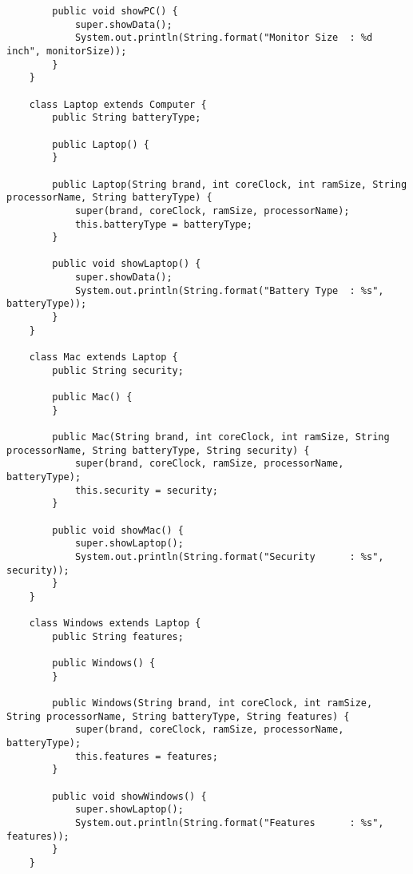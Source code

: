 \documentclass[12pt,titlepage]{article}
\begin{document}
\begin{verbatim}
        public void showPC() {
            super.showData();
            System.out.println(String.format("Monitor Size  : %d inch", monitorSize));
        }
    }

    class Laptop extends Computer {
        public String batteryType;
        
        public Laptop() {
        }
        
        public Laptop(String brand, int coreClock, int ramSize, String processorName, String batteryType) {
            super(brand, coreClock, ramSize, processorName);
            this.batteryType = batteryType;
        }
        
        public void showLaptop() {
            super.showData();
            System.out.println(String.format("Battery Type  : %s", batteryType));
        }
    }

    class Mac extends Laptop {
        public String security;
        
        public Mac() {
        }
        
        public Mac(String brand, int coreClock, int ramSize, String processorName, String batteryType, String security) {
            super(brand, coreClock, ramSize, processorName, batteryType);
            this.security = security;
        }
        
        public void showMac() {
            super.showLaptop();
            System.out.println(String.format("Security      : %s", security));
        }
    }

    class Windows extends Laptop {
        public String features;
        
        public Windows() {
        }
        
        public Windows(String brand, int coreClock, int ramSize, String processorName, String batteryType, String features) {
            super(brand, coreClock, ramSize, processorName, batteryType);
            this.features = features;
        }
        
        public void showWindows() {
            super.showLaptop();
            System.out.println(String.format("Features      : %s", features));
        }
    }
\end{verbatim}
\end{document}
